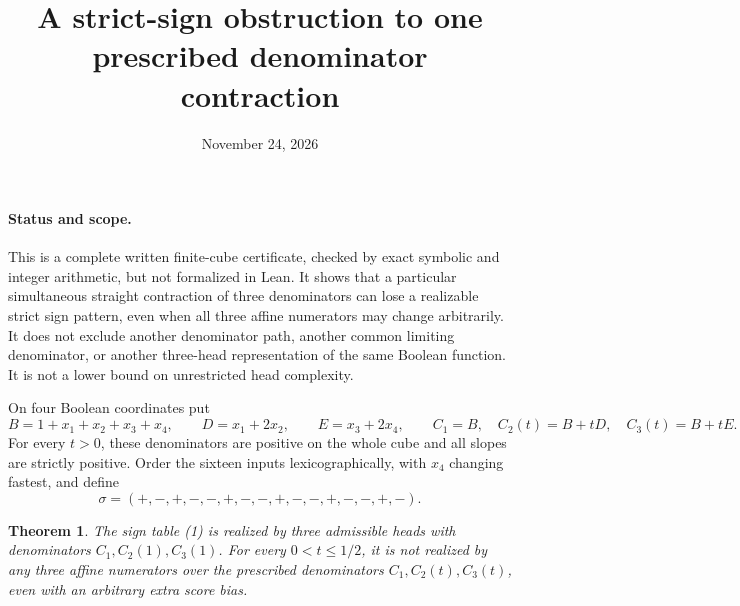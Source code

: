 \documentclass[11pt]{article}
\title{A strict-sign obstruction to one prescribed denominator contraction}
\author{}
\date{November 24, 2026}
\newtheorem{theorem}{Theorem}
\begin{document}
\maketitle

\paragraph{Status and scope.}
This is a complete written finite-cube certificate, checked by exact
symbolic and integer arithmetic, but not formalized in Lean. It shows
that a particular simultaneous straight contraction of three
denominators can lose a realizable strict sign pattern, even when all
three affine numerators may change arbitrarily. It does not exclude
another denominator path, another common limiting denominator, or
another three-head representation of the same Boolean function. It is
not a lower bound on unrestricted head complexity.

On four Boolean coordinates put
\[
 B=1+x_1+x_2+x_3+x_4,\qquad D=x_1+2x_2,\qquad E=x_3+2x_4,
 \qquad C_1=B,\quad C_2(t)=B+tD,\quad C_3(t)=B+tE.
\]
For every $t>0$, these denominators are positive on the whole cube and
all slopes are strictly positive. Order the sixteen inputs
lexicographically, with $x_4$ changing fastest, and define
\[
 \sigma=(+,-,+,-,-,+,-,-,+,-,-,+,-,-,+,-).
 \tag{1}
\]

\begin{theorem}
The sign table (1) is realized by three admissible heads with
denominators $C_1,C_2(1),C_3(1)$. For every $0<t\leq1/2$, it is not
realized by any three affine numerators over the prescribed
denominators $C_1,C_2(t),C_3(t)$, even with an arbitrary extra score bias.
\end{theorem}
\end{document}
